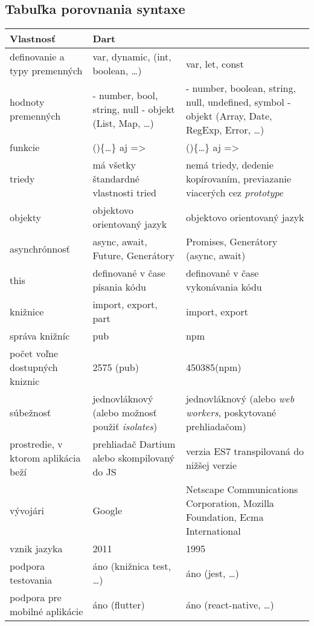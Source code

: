 \subsection{Tabuľka porovnania syntaxe}
\label{tab:compare}

\begin{tabular}{| p{4cm} | p{5cm} | p{5cm} |}
 \hline         %
   Vlastnosť & Dart & \JS{} \\ %
  \hline
  \hline
   definovanie a typy premenných & 
   var, dynamic,  (int, boolean, \ldots)& %
   var, let, const \\
  \hline
   hodnoty premenných & 
   - number, bool, string, null \newline
   - objekt (List, Map, \ldots)
    & 
   - number, boolean, string, null, undefined, symbol \newline
   - objekt (Array, Date, Reg\-Exp, Error, \ldots)
    \\
  \hline
   funkcie & 
   ()\{\ldots\} aj => & 
   ()\{\ldots\} aj => \\
  \hline
   triedy & 
   má všetky štandardné vlastnosti tried & 
   nemá triedy, dedenie kopírovaním, previazanie viacerých cez \emph{prototype} \\
  \hline
   objekty & 
   objektovo orientovaný jazyk & 
   objektovo orientovaný jazyk \\
  \hline
   asynchrónnosť &
   async, await, Future, Generátory & 
   Promises, Generátory (async, await) \\
  \hline
   this & 
   definované v čase písania kódu & 
   definované v čase vykonávania kódu \\
  \hline
   knižnice & 
   import, export, part & 
   import, export \\
  \hline
   správa knižníc & 
   pub & 
   npm \\
  \hline
   počet voľne dostupných kniznic & 
   2575 (pub) & 
   450385\footnotemark (npm) \\
  \hline
   súbežnosť & 
   jednovláknový (alebo možnosť použiť \emph{isolates}) & 
   jednovláknový (alebo \emph{web workers}, poskytované prehliadačom) \\
  \hline
   prostredie, v ktorom aplikácia beží & 
   prehliadač Dartium alebo skompilovaný do JS & 
   verzia ES7 transpilovaná do nižšej verzie \\
  \hline
   vývojári & 
   Google & 
   Netscape Communications Corporation, Mozilla Foundation, Ecma International \\
  \hline
   vznik jazyka & 
   2011 & 
   1995 \\
  \hline
   podpora testovania & 
   áno (knižnica test, \ldots) & 
   áno (jest, \ldots) \\
  \hline
  podpora pre mobilné aplikácie & 
  áno (flutter) & 
  áno (react-native, \ldots) \\
  \hline
 \end{tabular}
